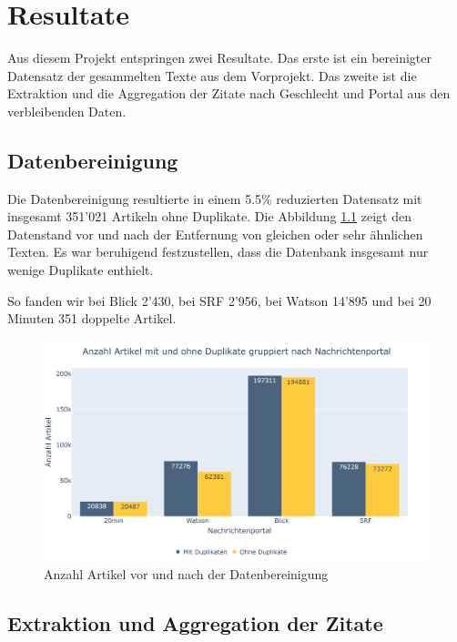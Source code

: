 
\chapter{Resultate}\label{results}

Aus diesem Projekt entspringen zwei Resultate. Das erste ist ein bereinigter
Datensatz der gesammelten Texte aus dem Vorprojekt. Das zweite ist die Extraktion
und die Aggregation der Zitate nach Geschlecht und Portal aus den verbleibenden Daten.

\section{Datenbereinigung}

Die Datenbereinigung resultierte in einem 5.5\% reduzierten Datensatz mit insgesamt 351'021 Artikeln ohne Duplikate.
Die Abbildung \ref{datenbereinigung} zeigt den Datenstand vor und nach der Entfernung von gleichen oder sehr ähnlichen Texten.
Es war beruhigend festzustellen, dass die Datenbank insgesamt nur wenige Duplikate enthielt.

So fanden wir bei Blick 2'430, bei SRF 2'956, bei Watson 14'895 und bei 20 Minuten 351 doppelte Artikel.

\begin{figure}[H]
	\begin{center}
        \centering
		\includegraphics[width=1\linewidth]{./images/datenbereinigung.png}
		\caption{Anzahl Artikel vor und nach der Datenbereinigung}
		\label{datenbereinigung}
	\end{center}
\end{figure}

\section{Extraktion und Aggregation der Zitate}

